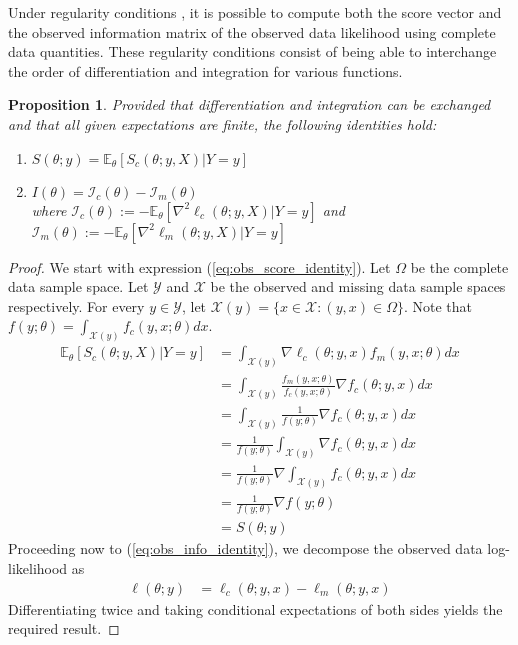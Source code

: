 \documentclass[11pt, oneside]{article}   	%
\newcommand{\bE}{\mathbb{E}}
\newtheorem{proposition}{Proposition}[section]
\begin{document}
Under regularity conditions \citep[see][]{McL08}, it is possible to compute both the score vector and the observed information matrix of the observed data likelihood using complete data quantities. These regularity conditions consist of being able to interchange the order of differentiation and integration for various functions.

\begin{proposition}
    \label{thm2:EM_decomp}
    Provided that differentiation and integration can be exchanged and that all given expectations are finite, the following identities hold:
    \begin{enumerate}[label=(\roman*)]
        \item $S(\theta; y) = \bE_\theta [S_c(\theta; y, X)|Y=y]$ \label{eq:obs_score_identity}
        \item $I(\theta) = \mathcal{I}_c(\theta) - \mathcal{I}_m(\theta)$ \label{eq:obs_info_identity}\\
        where $\mathcal{I}_c(\theta) := - \bE_\theta \left[ \nabla^2 \ell_c(\theta; y, X) | Y=y \right]$ and $\mathcal{I}_m(\theta) := - \bE_\theta \left[ \nabla^2 \ell_m(\theta; y, X) | Y=y \right]$
    \end{enumerate}
\end{proposition}

\begin{proof}
    We start with expression (\ref{eq:obs_score_identity}). Let $\Omega$ be the complete data sample space. Let $\mathcal{Y}$ and $\mathcal{X}$ be the observed and missing data sample spaces respectively. For every $y \in \mathcal{Y}$, let $\mathcal{X}(y) = \{ x \in \mathcal{X}: (y,x) \in \Omega\}$. Note that $f(y; \theta) = \int_{\mathcal{X}(y)} f_c(y, x; \theta) dx$.
    \begin{align}
        \bE_\theta [S_c(\theta; y, X)|Y=y] &= \int_{\mathcal{X}(y)} \nabla \ell_c(\theta; y, x) f_m(y, x; \theta) dx \nonumber\\
        &= \int_{\mathcal{X}(y)} \frac{f_m(y, x; \theta)}{f_c(y, x; \theta)} \nabla f_c(\theta; y, x) dx \nonumber\\
        &= \int_{\mathcal{X}(y)} \frac{1}{f(y; \theta)} \nabla f_c(\theta; y, x) dx\nonumber\\
        &= \frac{1}{f(y; \theta)} \int_{\mathcal{X}(y)} \nabla f_c(\theta; y, x) dx\nonumber\\
        &= \frac{1}{f(y; \theta)} \nabla \int_{\mathcal{X}(y)} f_c(\theta; y, x) dx \nonumber\\
        &= \frac{1}{f(y; \theta)} \nabla f(y; \theta)\nonumber\\
        &= S(\theta; y) \nonumber
    \end{align}
    Proceeding now to (\ref{eq:obs_info_identity}), we decompose the observed data log-likelihood as
    \begin{align*}
        \ell(\theta; y) &= \ell_c(\theta; y, x) - \ell_m(\theta; y, x)
    \end{align*}
    Differentiating twice and taking conditional expectations of both sides yields the required result.
\end{proof}
\end{document}
